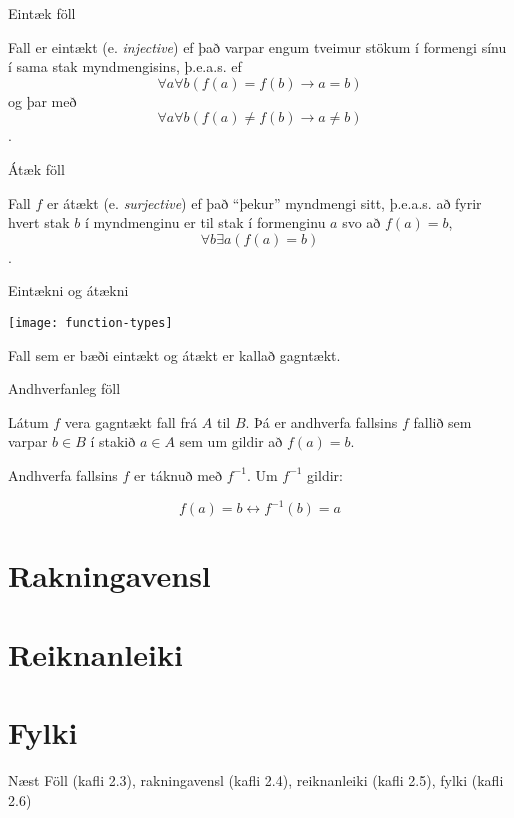 \documentclass{beamer}
\begin{document}
\begin{frame}{Eintæk föll}
\begin{tcolorbox}[title=Eintækt fall]
Fall er eintækt (e. \emph{injective}) ef það varpar engum tveimur stökum í formengi sínu í sama stak myndmengisins, þ.e.a.s. ef \[\forall a \forall b (f(a) = f(b) \to a = b)\] og þar með \[\forall a \forall b (f(a) \neq f(b) \to a \neq b)\].
\end{tcolorbox}
\end{frame}

\begin{frame}{Átæk föll}
\begin{tcolorbox}[title=Átækt fall]
Fall $f$ er átækt (e. \emph{surjective}) ef það ``þekur'' myndmengi sitt, þ.e.a.s. að fyrir hvert stak $b$ í myndmenginu er til stak í formenginu $a$ svo að $f(a) = b$, \[\forall b \exists a (f(a) = b)\].
\end{tcolorbox}
\end{frame}

\begin{frame}{Eintækni og átækni}
\begin{center}
\texttt{[image: function-types]}
\end{center}
Fall sem er bæði eintækt og átækt er kallað gagntækt.
\end{frame}

\begin{frame}{Andhverfanleg föll}
\begin{tcolorbox}[title=Andhverfanlegt fall]
Látum $f$ vera gagntækt fall frá $A$ til $B$. Þá er andhverfa fallsins $f$ fallið sem varpar $b \in B$ í stakið $a \in A$ sem um gildir að $f(a) = b$.

Andhverfa fallsins $f$ er táknuð með $f^{-1}$. Um $f^{-1}$ gildir:

\[
 f(a) = b \leftrightarrow f^{-1}(b) = a
\]

\end{tcolorbox}
\end{frame}



\section{Rakningavensl}

\section{Reiknanleiki}

\section{Fylki}

\begin{frame}{Næst}
Föll (kafli 2.3), rakningavensl (kafli 2.4), reiknanleiki (kafli 2.5), fylki (kafli 2.6)
\end{frame}
\end{document}
